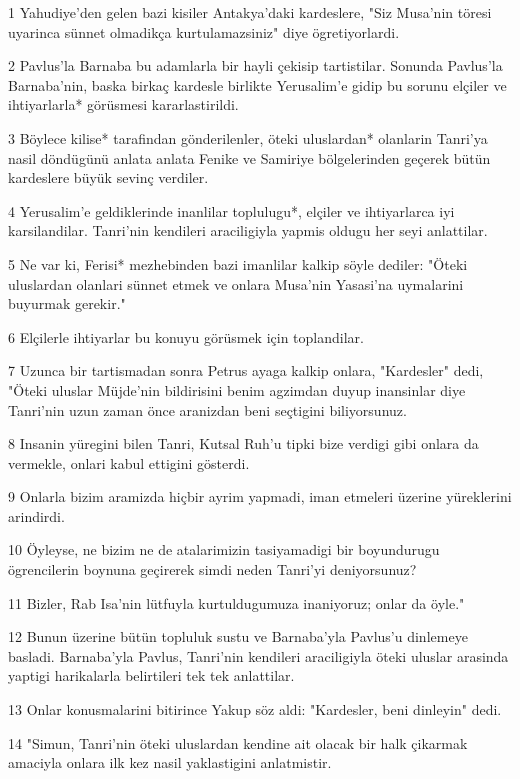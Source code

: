 \par 1 Yahudiye'den gelen bazi kisiler Antakya'daki kardeslere, "Siz Musa'nin töresi uyarinca sünnet olmadikça kurtulamazsiniz" diye ögretiyorlardi.
\par 2 Pavlus'la Barnaba bu adamlarla bir hayli çekisip tartistilar. Sonunda Pavlus'la Barnaba'nin, baska birkaç kardesle birlikte Yerusalim'e gidip bu sorunu elçiler ve ihtiyarlarla* görüsmesi kararlastirildi.
\par 3 Böylece kilise* tarafindan gönderilenler, öteki uluslardan* olanlarin Tanri'ya nasil döndügünü anlata anlata Fenike ve Samiriye bölgelerinden geçerek bütün kardeslere büyük sevinç verdiler.
\par 4 Yerusalim'e geldiklerinde inanlilar toplulugu*, elçiler ve ihtiyarlarca iyi karsilandilar. Tanri'nin kendileri araciligiyla yapmis oldugu her seyi anlattilar.
\par 5 Ne var ki, Ferisi* mezhebinden bazi imanlilar kalkip söyle dediler: "Öteki uluslardan olanlari sünnet etmek ve onlara Musa'nin Yasasi'na uymalarini buyurmak gerekir."
\par 6 Elçilerle ihtiyarlar bu konuyu görüsmek için toplandilar.
\par 7 Uzunca bir tartismadan sonra Petrus ayaga kalkip onlara, "Kardesler" dedi, "Öteki uluslar Müjde'nin bildirisini benim agzimdan duyup inansinlar diye Tanri'nin uzun zaman önce aranizdan beni seçtigini biliyorsunuz.
\par 8 Insanin yüregini bilen Tanri, Kutsal Ruh'u tipki bize verdigi gibi onlara da vermekle, onlari kabul ettigini gösterdi.
\par 9 Onlarla bizim aramizda hiçbir ayrim yapmadi, iman etmeleri üzerine yüreklerini arindirdi.
\par 10 Öyleyse, ne bizim ne de atalarimizin tasiyamadigi bir boyundurugu ögrencilerin boynuna geçirerek simdi neden Tanri'yi deniyorsunuz?
\par 11 Bizler, Rab Isa'nin lütfuyla kurtuldugumuza inaniyoruz; onlar da öyle."
\par 12 Bunun üzerine bütün topluluk sustu ve Barnaba'yla Pavlus'u dinlemeye basladi. Barnaba'yla Pavlus, Tanri'nin kendileri araciligiyla öteki uluslar arasinda yaptigi harikalarla belirtileri tek tek anlattilar.
\par 13 Onlar konusmalarini bitirince Yakup söz aldi: "Kardesler, beni dinleyin" dedi.
\par 14 "Simun, Tanri'nin öteki uluslardan kendine ait olacak bir halk çikarmak amaciyla onlara ilk kez nasil yaklastigini anlatmistir.

